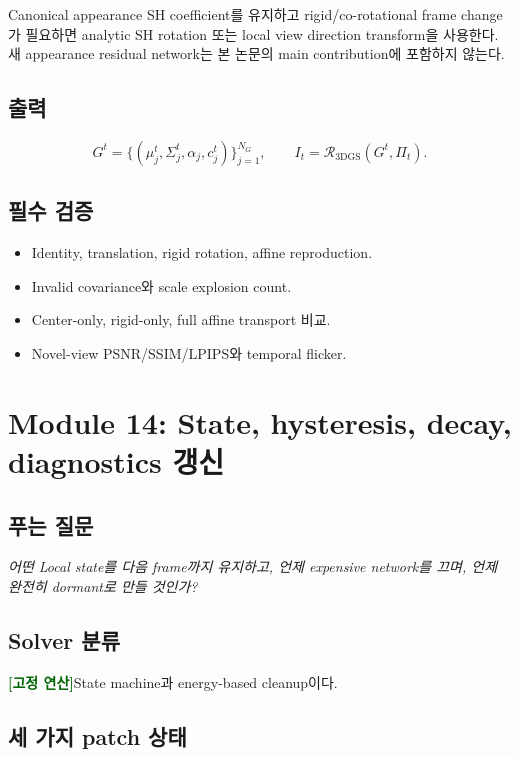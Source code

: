 \documentclass[11pt,a4paper]{article}
\newcommand{\deterministic}{\textcolor{darkgreen}{\textbf{[고정 연산]}}}
\begin{document}
Canonical appearance SH coefficient를 유지하고
rigid/co-rotational frame change가 필요하면 analytic SH rotation 또는
local view direction transform을 사용한다.
새 appearance residual network는 본 논문의 main contribution에 포함하지 않는다.

\subsection*{출력}

\begin{equation}
  G^t
  =
  \{(\mu_j^t,\Sigma_j^t,\alpha_j,c_j^t)\}_{j=1}^{N_G},
  \qquad
  I_t=\mathcal R_{\mathrm{3DGS}}(G^t,\Pi_t).
\end{equation}

\subsection*{필수 검증}

\begin{itemize}[leftmargin=1.5em]
  \item Identity, translation, rigid rotation, affine reproduction.
  \item Invalid covariance와 scale explosion count.
  \item Center-only, rigid-only, full affine transport 비교.
  \item Novel-view PSNR/SSIM/LPIPS와 temporal flicker.
\end{itemize}

\section{Module 14: State, hysteresis, decay, diagnostics 갱신}

\subsection*{푸는 질문}

\emph{어떤 Local state를 다음 frame까지 유지하고,
언제 expensive network를 끄며, 언제 완전히 dormant로 만들 것인가?}

\subsection*{Solver 분류}

\deterministic State machine과 energy-based cleanup이다.

\subsection*{세 가지 patch 상태}
\end{document}
